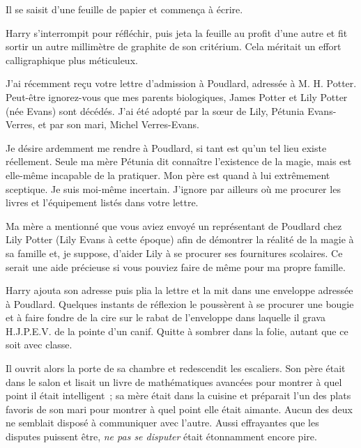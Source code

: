 Il se saisit d'une feuille de papier et commença à écrire.

\begin{writtenNote}
\end{writtenNote}

Harry s'interrompit pour réfléchir, puis jeta la feuille au profit d'une autre et fit sortir un autre millimètre de graphite de son critérium. Cela méritait un effort calligraphique plus méticuleux.

\begin{writtenNote}

J'ai récemment reçu votre lettre d'admission à Poudlard, adressée à M. H. Potter.  Peut-être ignorez-vous que mes parents biologiques, James Potter et Lily Potter (née Evans) sont décédés. J'ai été adopté par la sœur de Lily, Pétunia Evans-Verres, et par son mari, Michel Verres-Evans.

Je désire ardemment me rendre à Poudlard, si tant est qu'un tel lieu existe réellement. Seule ma mère Pétunia dit connaître l'existence de la magie, mais est elle-même incapable de la pratiquer. Mon père est quand à lui extrêmement sceptique. Je suis moi-même incertain.  J'ignore par ailleurs où me procurer les livres et l'équipement listés dans votre lettre.

Ma mère a mentionné que vous aviez envoyé un représentant de Poudlard chez Lily Potter (Lily Evans à cette époque) afin de démontrer la réalité de la magie à sa famille et, je suppose, d'aider Lily à se procurer ses fournitures scolaires. Ce serait une aide précieuse si vous pouviez faire de même pour ma propre famille.

\end{writtenNote}

Harry ajouta son adresse puis plia la lettre et la mit dans une enveloppe adressée à Poudlard. Quelques instants de réflexion le poussèrent à se procurer une bougie et à faire fondre de la cire sur le rabat de l'enveloppe dans laquelle il grava H.J.P.E.V.  de la pointe d'un canif. Quitte à sombrer dans la folie, autant que ce soit avec classe.

Il ouvrit alors la porte de sa chambre et redescendit les escaliers. Son père était dans le salon et lisait un livre de mathématiques avancées pour montrer à quel point il était intelligent~; sa mère était dans la cuisine et préparait l'un des plats favoris de son mari pour montrer à quel point elle était aimante. Aucun des deux ne semblait disposé à communiquer avec l'autre. Aussi effrayantes que les disputes puissent être, \emph{ne pas se disputer} était étonnamment encore pire.

